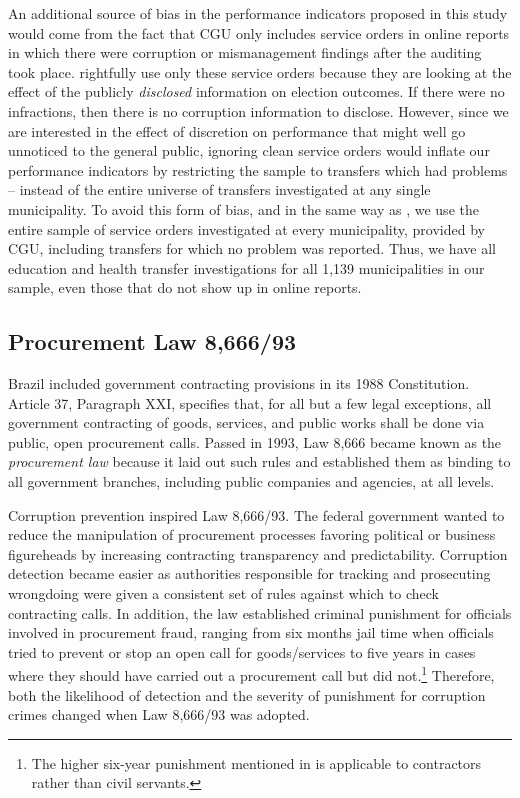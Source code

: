\documentclass[11pt]{article}
\begin{document}
An additional source of bias in the performance indicators proposed in this study would come from the fact that CGU only includes service orders in online reports in which there were corruption or mismanagement findings after the auditing took place. \citet{FerrazExposingCorruptPoliticians2008b} rightfully use only these service orders because they are looking at the effect of the publicly \emph{disclosed} information on election outcomes. If there were no infractions, then there is no corruption information to disclose. However, since we are interested in the effect of discretion on performance that might well go unnoticed to the general public, ignoring clean service orders would inflate our performance indicators by restricting the sample to transfers which had problems -- instead of the entire universe of transfers investigated at any single municipality. To avoid this form of bias, and in the same way as \citet{FerrazElectoralAccountabilityCorruption2011a}, we use the entire sample of service orders investigated at every municipality, provided by CGU, including transfers for which no problem was reported. Thus, we have all education and health transfer investigations for all 1,139 municipalities in our sample, even those that do not show up in online reports.

\subsection{Procurement Law 8,666/93} \label{subsec:law866693}

Brazil included government contracting provisions in its 1988 Constitution. Article 37, Paragraph XXI, specifies that, for all but a few legal exceptions, all government contracting of goods, services, and public works shall be done via public, open procurement calls. Passed in 1993, Law 8,666 became known as the \emph{procurement law} because it laid out such rules and established them as binding to all government branches, including public companies and agencies, at all levels.

Corruption prevention inspired Law 8,666/93. The federal government wanted to reduce the manipulation of procurement processes favoring political or business figureheads by increasing contracting transparency and predictability. Corruption detection became easier as authorities responsible for tracking and prosecuting wrongdoing were given a consistent set of rules against which to check contracting calls. In addition, the law established criminal punishment for officials involved in procurement fraud, ranging from six months jail time when officials tried to prevent or stop an open call for goods/services to five years in cases where they should have carried out a procurement call but did not.\footnote{The higher six-year punishment mentioned in \citet{ZamboniAuditRiskRent2018} is applicable to contractors rather than civil servants.} Therefore, both the likelihood of detection and the severity of punishment for corruption crimes changed when Law 8,666/93 was adopted.
\end{document}
